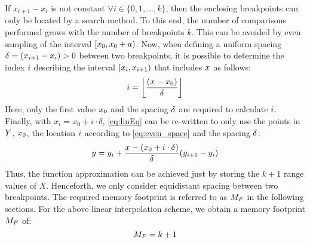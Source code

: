 If $x_{i+1}-x_i$ is not constant $\forall i \in \{0,1,\hdots,k\}$, then the enclosing breakpoints can only be located by a search method. 
To this end, the number of comparisons performed grows with the number of breakpoints $k$. This can be avoided by even sampling of the interval $[x_{0}, x_{0}+a)$. Now, when defining a uniform spacing $\delta_{ }=(x_{i+1}-x_i)>0$ between two breakpoints, it is possible to determine the index $i$ describing the interval $[x_{i}, x_{i+1})$ that includes $x_{}$ as follows:
\begin{equation}\label{eq:even_space}
   i = \bigg\lfloor \frac{(x_{}-x_{0})}{\delta_{ }}\bigg \rfloor
\end{equation}
Here, only the first value $x_{0}$ and the spacing $\delta_{ }$ are required to calculate $i$.
Finally, with $x_i = x_0 + i \cdot \delta$, \cref{eq:linEq} can be re-written to only use the points in $Y$, $x_{0}$, the location $i$ according to \cref{eq:even_space} and the spacing $\delta_{}$:
%
\begin{equation}\label{eq:2pt_line_even}
   \RangeBreakpoint{}=
   \RangeBreakpoint{i}+\frac{\Breakpoint{}-(\Breakpoint{0} + \IndexLocation \cdot \Spacing{})}{\Spacing{}}(\RangeBreakpoint{i+1}-\RangeBreakpoint{i})%
\end{equation}
Thus, the function approximation can be achieved just by storing the $k+1$ range values of $X$. 
Henceforth, we only consider equidistant spacing between two breakpoints. 
The required memory footprint is referred to as $M_{F}$ in the following sections.
For the above linear interpolation scheme, we obtain a memory footprint $M_{F}$ of:
\begin{equation}
M_{F}=k+1
\label{eq:refEquation}
\end{equation}
